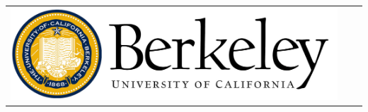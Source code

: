 \documentclass[final]{beamer}
\newlength{\onecolwid}
\begin{document}
\begin{frame}[t]
\begin{columns}[t]
\begin{column}{\onecolwid}

%
%
%


%
%
%

\begin{center}
\begin{tabular}{ccc}
\includegraphics[width=.4\linewidth]{berkeleylogo.jpg} 
\end{tabular}
\end{center}


\end{column} %

\end{columns} %

\end{frame} %
\end{document}
